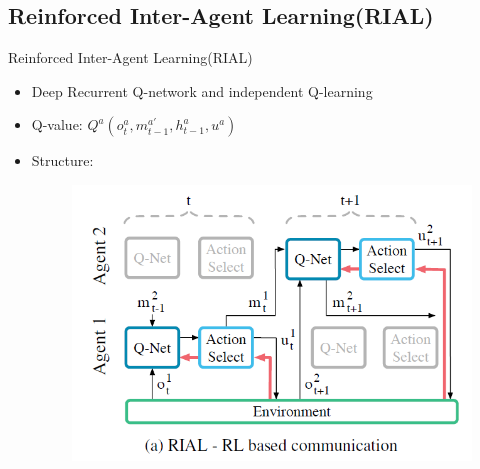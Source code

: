 \documentclass[mathserif]{beamer}
\begin{document}
\subsection{Reinforced Inter-Agent Learning(RIAL)}
\begin{frame}{Reinforced Inter-Agent Learning(RIAL)}
\begin{itemize}
  \item Deep Recurrent Q-network and independent Q-learning
  \item Q-value: $Q^{a}(o_{t}^{a},m_{t-1}^{a'},h_{t-1}^{a},u^{a})$
  \item Structure:
  \begin{figure}
    \centering
    \includegraphics[scale=0.6]{fig/1}
  \end{figure}
\end{itemize}
\end{frame}
\end{document}
